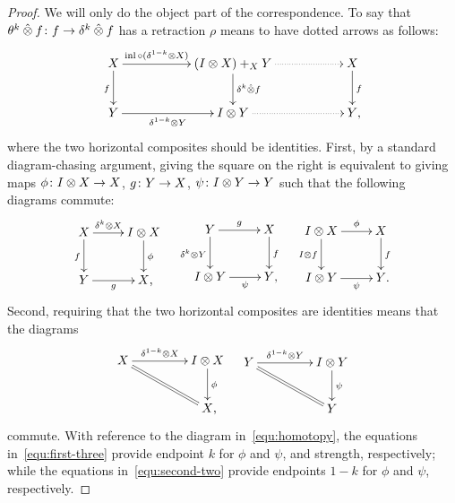 \documentclass[reqno,10pt,a4paper,oneside,draft]{amsart}
\begin{document}
\begin{proof}
We will only do the object part of the correspondence.
To say that $\theta^k \mathbin{\hat{\otimes}} f \colon f \to \delta^k \mathbin{\hat{\otimes}} f$ has a retraction $\rho$ means to have dotted arrows as follows:
\[
\xymatrix@C+3em{
  X
  \ar[r]^-{\inl \cc (\kcylinv \otimes X)}
  \ar[d]_f
&
  (\interval \otimes X) +_X Y
  \ar[d]^{\kcyl \hatotimes f}
  \ar@{.>}[r]
&
  X
  \ar[d]^f
\\
  Y
  \ar[r]_-{\kcylinv \otimes Y}
&
  \interval \otimes Y
  \ar@{.>}[r]
&
  Y
\rlap{,}}
\]
where the two horizontal composites should be identities.
First, by a standard diagram-chasing argument, giving the square on the right is equivalent to giving maps $\phi \colon I \otimes X \to X$, $g \colon Y \to X$, $\psi \colon I \otimes Y \to Y$ such that the following diagrams commute:
\begin{align} \label{equ:first-three}
\xycenter{
  X
  \ar[r]^-{\kcyl \otimes X}
  \ar[d]_f
&
  \interval \otimes X
  \ar[d]^{\phi}
\\
  Y \ar[r]_-{g}
&
  X
\rlap{,}}
&&
\xycenter{
  Y
  \ar[r]^-g
  \ar[d]_{\kcyl \otimes Y}
&
  X
  \ar[d]^f
\\
  \interval \otimes Y
  \ar[r]_-{\psi}
&
  Y
\rlap{,}}
&&
\xycenter{
  \interval \otimes X
  \ar[r]^-\phi
  \ar[d]_{I \otimes f}
&
  X
  \ar[d]^{f}
\\
  \interval \otimes Y
  \ar[r]_-{\psi}
&
  Y
\rlap{.}}
\end{align}
Second, requiring that the two horizontal composites are identities means that the diagrams
\begin{align} \label{equ:second-two}
\begin{gathered}
\xymatrix@C+2em{
  X
  \ar[r]^-{\kcylinv \otimes X}
  \ar@{=}[dr]
&
  \interval \otimes X
  \ar[d]^\phi
\\&
  X
\rlap{,}}
\end{gathered}
&&
\begin{gathered}
\xymatrix@C+2em{
  Y
  \ar[r]^-{\kcylinv \otimes Y}
  \ar@{=}[dr]
&
  \interval \otimes Y
  \ar[d]^{\psi}
\\&
  Y
}
\end{gathered}
\end{align}
commute.
With reference to the diagram in~\eqref{equ:homotopy}, the equations in~\eqref{equ:first-three} provide endpoint $k$ for $\phi$ and $\psi$, and strength, respectively; while the equations in~\eqref{equ:second-two} provide endpoints $1-k$ for $\phi$ and $\psi$, respectively.
\end{proof}
\end{document}
